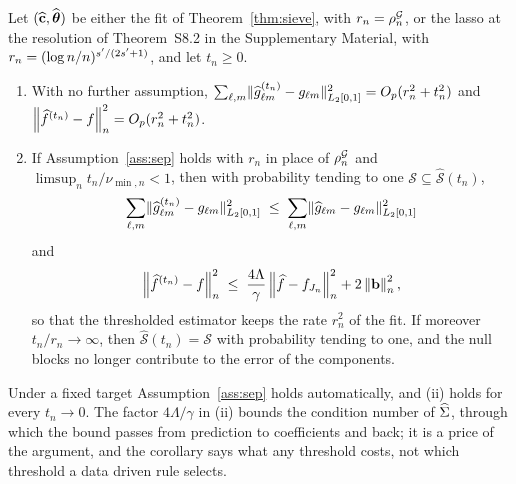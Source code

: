 \begin{corollary}
\label{cor:thrisk}
Let $(\widehat{\mathbf{c}},\widehat{\boldsymbol{\theta}})$ be either the fit of Theorem~\ref{thm:sieve}, with
$r_n = \rho^{\mathcal{G}}_{n}$, or the lasso at the resolution of Theorem~S8.2 in the
Supplementary Material, with $r_n = (\log n/n)^{s'/(2s'+1)}$, and let
$t_n \ge 0$.
\begin{enumerate}
\item[(i)] With no further assumption,
$\sum_{\ell,m}\lVert\widehat{g}^{(t_n)}_{\ell m}-g_{\ell m}\rVert_{L_2[0,1]}^{2}
= O_p(r_n^{2} + t_n^{2})$ and
$\left\lVert \widehat{f}^{(t_n)}-f \right\rVert_{n}^{2} = O_p(r_n^{2} + t_n^{2})$.
\item[(ii)] If Assumption~\ref{ass:sep} holds with $r_n$ in place of $\rho^{\mathcal{G}}_{n}$
and $\limsup_n t_n/\nu_{\min,n} < 1$, then with probability tending to one
$\mathcal{S} \subseteq \widehat{\mathcal{S}}(t_n)$,
\[
  \sum_{\ell,m}\lVert\widehat{g}^{(t_n)}_{\ell m}-g_{\ell m}\rVert_{L_2[0,1]}^{2}
  \;\le\; \sum_{\ell,m}\lVert\widehat{g}_{\ell m}-g_{\ell m}\rVert_{L_2[0,1]}^{2}
\]
and
\[
  \left\lVert \widehat{f}^{(t_n)}-f \right\rVert_{n}^{2} \;\le\;
  \frac{4\Lambda}{\gamma}\left\lVert \widehat{f}-f_{J_n} \right\rVert_{n}^{2} + 2\left\lVert \mathbf{b} \right\rVert_{n}^{2},
\]
so that the thresholded estimator keeps the rate $r_n^{2}$ of the fit. If
moreover $t_n/r_n \to \infty$, then
$\widehat{\mathcal{S}}(t_n) = \mathcal{S}$ with probability tending to one,
and the null blocks no longer contribute to the error of the components.
\end{enumerate}
\end{corollary}

Under a fixed target Assumption~\ref{ass:sep} holds automatically, and (ii)
holds for every $t_n \to 0$. The factor $4\Lambda/\gamma$ in (ii) bounds the
condition number of $\widehat{\Sigma}$, through which the bound passes from
prediction to coefficients and back; it is a price of the argument, and the
corollary says what any threshold costs, not which threshold a data driven
rule selects.


